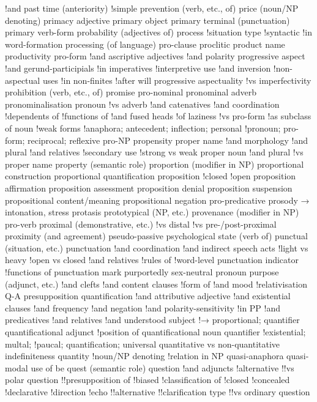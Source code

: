 !and past time (anteriority)
!simple
prevention (verb, etc., of)
price (noun/NP denoting)
primacy adjective
primary object
primary terminal (punctuation)
primary verb-form
probability (adjectives of)
process
!situation type
!syntactic
!in word-formation
processing (of language)
pro-clause
proclitic
product name
productivity
pro-form
!and ascriptive adjectives
!and polarity
progressive aspect
!and gerund-participials
!in imperatives
!interpretive use
!and inversion
!non-aspectual uses
!in non-finites
!after will
progressive aspectuality
!vs imperfectivity
prohibition (verb, etc., of)
promise
pro-nominal
pronominal adverb
pronominalisation
pronoun
!vs adverb
!and catenatives
!and coordination
!dependents of
!functions of
!and fused heads
!of laziness
!vs pro-form
!as subclass of noun
!weak forms
!anaphora; antecedent; inflection; personal
!pronoun; pro-form; reciprocal; reflexive
pro-NP
propensity
proper name
!and morphology
!and plural
!and relatives
!secondary use
!strong vs weak
proper noun
!and plural
!vs proper name
property (semantic role)
proportion (modifier in NP)
proportional construction
proportional quantification
proposition
!closed
!open
proposition affirmation
proposition assessment
proposition denial
proposition suspension
propositional content/meaning
propositional negation
pro-predicative
prosody → intonation, stress
protasis
prototypical (NP, etc.)
provenance (modifier in NP)
pro-verb
proximal (demonstrative, etc.)
!vs distal
!vs pre-/post-proximal
proximity (and agreement)
pseudo-passive
psychological state (verb of)
punctual (situation, etc.)
punctuation
!and coordination
!and indirect speech acts
!light vs heavy
!open vs closed
!and relatives
!rules of
!word-level
punctuation indicator
!functions of
punctuation mark
purportedly sex-neutral pronoun
purpose (adjunct, etc.)
!and clefts
!and content clauses
!form of
!and mood
!relativisation
Q-A presupposition
quantification
!and attributive adjective
!and existential clauses
!and frequency
!and negation
!and polarity-sensitivity
!in PP
!and predicatives
!and relatives
!and understood subject
!→ proportional; quantifier
quantificational adjunct
!position of
quantificational noun
quantifier
!existential; multal;
!paucal; quantification; universal
quantitative vs non-quantitative indefiniteness
quantity
!noun/NP denoting
!relation in NP
quasi-anaphora
quasi-modal use of be
quest (semantic role)
question
!and adjuncts
!alternative
!!vs polar question
!!presupposition of
!biased
!classification of
!closed
!concealed
!declarative
!direction
!echo
!!alternative
!!clarification type
!!vs ordinary question
